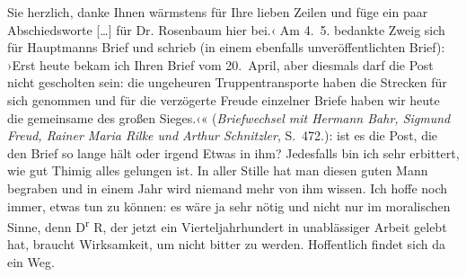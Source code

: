 {{{                     Sie herzlich, danke Ihnen wärmstens für Ihre lieben Zeilen und füge ein paar
                     Abschiedsworte {[}\ldots{]} für Dr.
                        Rosenbaum hier bei.‹ Am
                        4. 5. bedankte Zweig
                     sich für Hauptmanns Brief und schrieb
                     (in einem ebenfalls unveröffentlichten Brief): ›Erst heute bekam ich Ihren
                     Brief vom 20. April, aber diesmals darf die Post nicht gescholten
                     sein: die ungeheuren Truppentransporte haben die Strecken für sich genommen und
                     für die verzögerte Freude einzelner Briefe haben wir heute die gemeinsame des
                     großen Sieges.‹« (\emph{Briefwechsel mit Hermann Bahr, Sigmund Freud, Rainer Maria
                        Rilke und Arthur Schnitzler}, S. 472.)}}}\label{K_L03654-3}: ist es die
               Post, die den Brief so lange hält oder irgend Etwas in ihm? Jedesfalls bin ich sehr
               erbittert, wie gut Thimig alles gelungen ist.
               In aller Stille hat man diesen guten Mann begraben und in einem Jahr wird niemand mehr von ihm
               wissen. Ich hoffe noch immer, etwas tun zu können: es wäre ja sehr nötig und nicht
               nur im moralischen Sinne, denn D\textsuperscript{r}{ }R, der jetzt ein Vierteljahrhundert in
               unablässiger Arbeit gelebt hat, braucht Wirksamkeit, um nicht bitter zu werden.
               Hoffentlich findet sich da ein Weg.\pend
           
